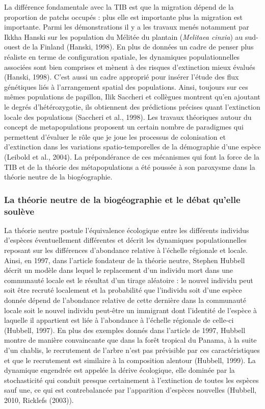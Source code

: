 La différence fondamentale avec la TIB est que la migration dépend de la
proportion de patchs occupés : plus elle est importante plus la
migration est importante. Parmi les démonstrations il y a les travaux
menés notamment par Ikkha Hanski sur les population du Mélitée du
plantain (\emph{Melitaea cinxia}) au sud-ouest de la Finland (Hanski,
1998). En plus de données un cadre de penser plus réaliste en terme de
configuration spatiale, les dynamiques populationnelles associées sont
bien comprises et mènent à des risques d'extinction mieux évalués
(Hanski, 1998). C'est aussi un cadre approprié pour insérer l'étude des
flux génétiques liés à l'arrangement spatial des populations. Ainsi,
toujours sur ces mêmes populations de papillon, Ilik Saccheri et
collègues montrent qu'en ajoutant le degrés d'hétérozygotie, ils
obtiennent des prédictions précises quant l'extinction locale des
populations (Saccheri et al., 1998). Les travaux théoriques autour du
concept de metapopulations proposent un certain nombre de paradigmes qui
permettent d'évaluer le rôle que je joue les processus de colonisation
et d'extinction dans les variations spatio-temporelles de la démographie
d'une espèce (Leibold et al., 2004). La prépondérance de ces mécanismes
qui font la force de la TIB et de la théorie des métapopulations a été
poussée à son paroxysme dans la théorie neutre de la biogéographie.

\subsubsection*{La théorie neutre de la biogéographie et le débat
qu'elle
soulève}\label{la-thuxe9orie-neutre-de-la-bioguxe9ographie-et-le-duxe9bat-quelle-souluxe8ve}

La théorie neutre postule l'équivalence écologique entre les différents
individus d'espèces éventuellement différentes et décrit les dynamiques
populationnelles reposant sur les différences d'abondance relative à
l'échelle régionale et locale. Ainsi, en 1997, dans l'article fondateur
de la théorie neutre, Stephen Hubbell décrit un modèle dans lequel le
replacement d'un individu mort dans une communauté locale est le
résultat d'un tirage aléatoire : le nouvel individu peut soit être
recruté localement et la probabilité que l'individu soit d'une espèce
donnée dépend de l'abondance relative de cette dernière dans la
communauté locale soit le nouvel individu peut-être un immigrant dont
l'identité de l'espèce à laquelle il appartient est liée à l'abondance à
l'échelle régionale de celle-ci (Hubbell, 1997). En plus des exemples
donnés dans l'article de 1997, Hubbell montre de manière convaincante
que dans la forêt tropical du Panama, à la suite d'un chablis, le
recrutement de l'arbre n'est pas prévisible par ces caractéristiques et
que le recrutement est similaire à la composition alentour (Hubbell,
1999). La dynamique engendrée est appelée la dérive écologique, elle
dominée par la stochasticité qui conduit presque certainement à
l'extinction de toutes les espèces sauf une, ce qui est contrebalancée
par l'apparition d'espèces nouvelles (Hubbell, 2010, Ricklefs (2003)).

